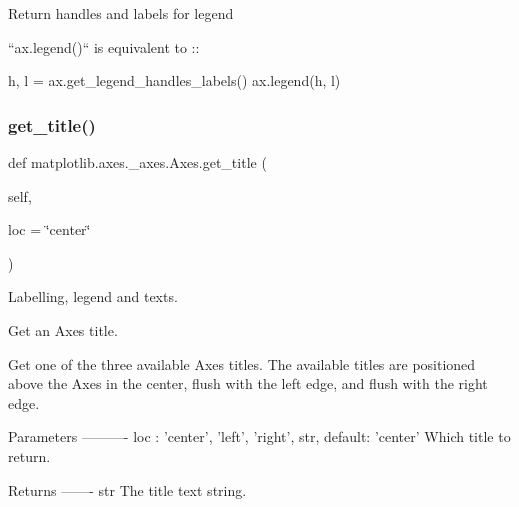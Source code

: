 \begin{DoxyVerb}Return handles and labels for legend

``ax.legend()`` is equivalent to ::

  h, l = ax.get_legend_handles_labels()
  ax.legend(h, l)
\end{DoxyVerb}
 \mbox{\label{classmatplotlib_1_1axes_1_1__axes_1_1Axes_a4c96d26db49ace6f5d6aba17d9c0e013}} 
\subsubsection{\texorpdfstring{get\+\_\+title()}{get\_title()}}
{\footnotesize\ttfamily def matplotlib.\+axes.\+\_\+axes.\+Axes.\+get\+\_\+title (\begin{DoxyParamCaption}\item[{}]{self,  }\item[{}]{loc = {\ttfamily \char`\"{}center\char`\"{}} }\end{DoxyParamCaption})}



Labelling, legend and texts. 

\begin{DoxyVerb}Get an Axes title.

Get one of the three available Axes titles. The available titles
are positioned above the Axes in the center, flush with the left
edge, and flush with the right edge.

Parameters
----------
loc : {'center', 'left', 'right'}, str, default: 'center'
    Which title to return.

Returns
-------
str
    The title text string.\end{DoxyVerb}
 \mbox{\label{classmatplotlib_1_1axes_1_1__axes_1_1Axes_a145712d37f6f1989cc251cfc4358140e}} 
